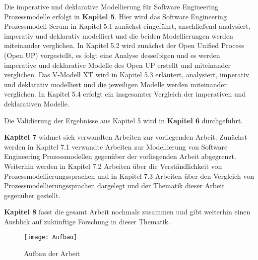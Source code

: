 Die imperative und deklarative Modellierung für Software Engineering Prozessmodelle erfolgt in \textbf{Kapitel 5}. Hier wird das Software Engineering Prozessmodell Scrum in Kapitel 5.1 zunächst eingeführt, anschließend analysiert, imperativ und deklarativ modelliert und die beiden Modellierungen werden miteinander verglichen. In Kapitel 5.2 wird zunächst der Open Unified Process (Open UP) vorgestellt, es folgt eine Analyse desselbigen und es werden imperative und deklarative Modelle des Open UP erstellt und miteinander verglichen. Das V-Modell XT wird in Kapitel 5.3 erläutert, analysiert, imperativ und deklarativ modelliert und die jeweiligen Modelle werden miteinander verglichen. In Kapitel 5.4 erfolgt ein insgesamter Vergleich der imperativen und deklarativen Modelle.\newline

Die Validierung der Ergebnisse aus Kapitel 5 wird in \textbf{Kapitel 6} durchgeführt. \newline

\textbf {Kapitel 7} widmet sich verwandten Arbeiten zur vorliegenden Arbeit. Zunächst werden in Kapitel 7.1 verwandte Arbeiten zur Modellierung von Software Engineering Prozessmodellen gegenüber der vorliegenden Arbeit abgegrenzt. Weiterhin werden in Kapitel 7.2 Arbeiten über die Verständlichkeit von Prozessmodellierungssprachen und in Kapitel 7.3 Arbeiten über den Vergleich von Prozessmodellierungssprachen dargelegt und der Thematik dieser Arbeit gegenüber gestellt.\newline

\textbf{Kapitel 8} fasst die gesamt Arbeit nochmals zusammen und gibt weiterhin einen Ausblick auf zukünftige Forschung in dieser Thematik.

\begin{figure}[htp]
\begin{center}
  \texttt{[image: Aufbau]} %
  \caption{Aufbau der Arbeit}
  \label{fig:Aufbau}
\end{center}
\end{figure}
